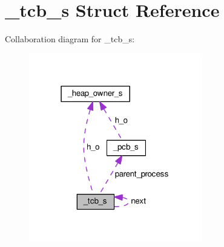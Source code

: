 \hypertarget{struct__tcb__s}{}\section{\+\_\+tcb\+\_\+s Struct Reference}
\label{struct__tcb__s}


Collaboration diagram for \+\_\+tcb\+\_\+s\+:\nopagebreak
\begin{figure}[H]
\begin{center}
\leavevmode
\includegraphics[width=214pt]{struct__tcb__s__coll__graph}
\end{center}
\end{figure}
